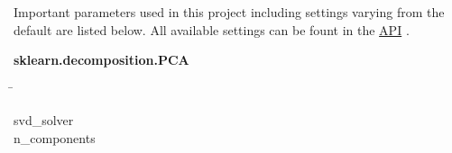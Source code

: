 





Important parameters used in this project including settings varying from the default are listed below. All available settings can be fount in the
\href{https://scikit-learn.org/stable/modules/generated/sklearn.decomposition.PCA.html}{API} \autocite{pedregosa_scikit-learn_2011}.


\begin{leftbar}
    \textbf{sklearn.decomposition.PCA}
    \begin{nstabbing}
        \qquad\qquad\qquad\qquad\qquad\quad\=\kill

        svd\_solver \\
        n\_components 
    \end{nstabbing}
\end{leftbar}